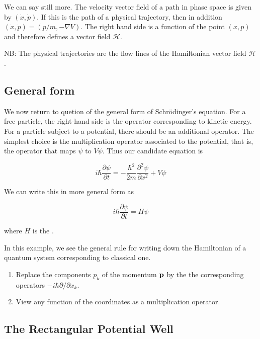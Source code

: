 We can say still more.  The velocity vector field of a path in phase space is given by $(\dot x, \dot p)$.  If this is the path of a physical trajectory, then in addition      $(\dot x, \dot p) = (p/m, -\nabla V)$.  The right hand side is a function of the point $(x,p)$ and therefore defines a vector field $\mathcal{H}$.  

NB: The physical trajectories are the flow lines of the Hamiltonian vector field $\mathcal{H}$.


\subsection{General form}

We now return to quetion of the general form of Schrödinger's equation. For  a free particle, the right-hand side is  the operator corresponding to kinetic energy.
For a particle subject to a potential, there should be an additional operator.  The simplest choice is the multiplication operator associated to the potential, that is, the operator that maps $\psi$ to $V\psi$.  Thus our candidate equation is

\begin{equation}
  i\hbar \frac{\partial \psi}{\partial t} 
    =
  -\frac{ \hbar^2 }{2m}\frac{ \partial^2 \psi}{ \partial x^2 }
   + V\psi
\end{equation}

We can write this in more general form as

\begin{equation}
  i\hbar \frac{\partial \psi}{\partial t} 
    =
  H\psi
\end{equation}

where $H$ is the .  

In this example, we see the general rule for writing down the Hamiltonian of a quantum system corresponding to classical one. 

\begin{enumerate}
\item Replace the components $p_k$ of the momentum $\bf{p}$ by the the corresponding operators $-i\hbar \partial/\partial x_k$.

\item View any function of the coordinates as a multiplication operator. 
\end{enumerate}

\subsection{The Rectangular Potential Well}


